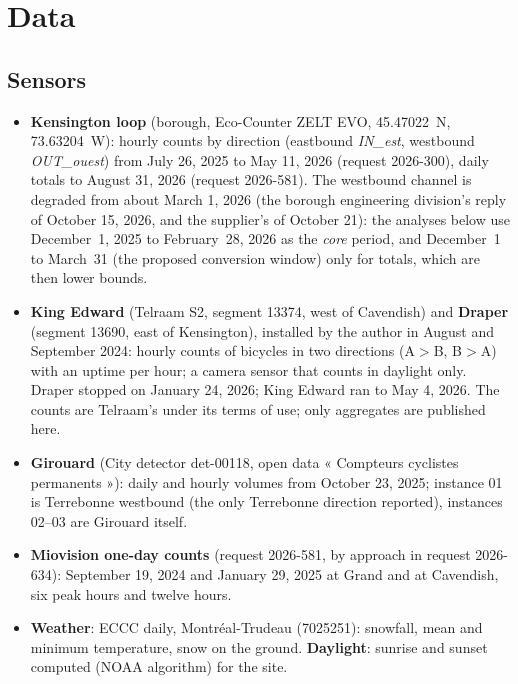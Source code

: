 \documentclass[11pt,a4paper]{article}
\begin{document}
\section{Data}
\subsection{Sensors}
\begin{itemize}
\item \textbf{Kensington loop} (borough, Eco-Counter ZELT EVO, 45.47022~N, 73.63204~W): hourly counts by direction (eastbound \emph{IN\_est}, westbound \emph{OUT\_ouest}) from July 26, 2025 to May 11, 2026 (request 2026-300), daily totals to August 31, 2026 (request 2026-581). The westbound channel is degraded from about March 1, 2026 (the borough engineering division\textquoteright{}s reply of October 15, 2026, and the supplier\textquoteright{}s of October 21): the analyses below use December~1, 2025 to February~28, 2026 as the \emph{core} period, and December~1 to March~31 (the proposed conversion window) only for totals, which are then lower bounds.
\item \textbf{King Edward} (Telraam S2, segment 13374, west of Cavendish) and \textbf{Draper} (segment 13690, east of Kensington), installed by the author in August and September 2024: hourly counts of bicycles in two directions (A$>$B, B$>$A) with an uptime per hour; a camera sensor that counts in daylight only. Draper stopped on January 24, 2026; King Edward ran to May 4, 2026. The counts are Telraam\textquoteright{}s under its terms of use; only aggregates are published here.
\item \textbf{Girouard} (City detector det-00118, open data « Compteurs cyclistes permanents »): daily and hourly volumes from October 23, 2025; instance 01 is Terrebonne westbound (the only Terrebonne direction reported), instances 02--03 are Girouard itself.
\item \textbf{Miovision one-day counts} (request 2026-581, by approach in request 2026-634): September 19, 2024 and January 29, 2025 at Grand and at Cavendish, six peak hours and twelve hours.
\item \textbf{Weather}: ECCC daily, Montréal-Trudeau (7025251): snowfall, mean and minimum temperature, snow on the ground. \textbf{Daylight}: sunrise and sunset computed (NOAA algorithm) for the site.
\end{itemize}
\end{document}

